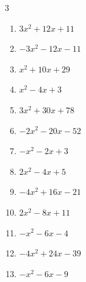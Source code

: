 \begin{multicols}{3}
\begin{enumerate}

  \item $3x^{2}+12x+11$


  \item $-3x^{2}-12x-11$


  \item $x^{2}+10x+29$


  \item $x^{2}-4x+3$


  \item $3x^{2}+30x+78$


  \item $-2x^{2}-20x-52$


  \item $-x^{2}-2x+3$


\columnbreak %

\resetques

  \item $2x^{2}-4x+5$


  \item $-4x^{2}+16x-21$


  \item $2x^{2}-8x+11$


  \item $-x^{2}-6x-4$


  \item $-4x^{2}+24x-39$


  \item $-x^{2}-6x-9$


\end{enumerate}
\end{multicols}
